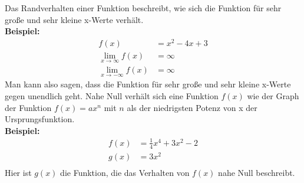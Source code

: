 \documentclass[25pt, a3paper, portrait]{tikzposter}
\begin{document}
    \begin{columns}
        {
            Das Randverhalten einer Funktion beschreibt, wie sich die Funktion für sehr große und sehr kleine x-Werte verhält. \\
            \textbf{Beispiel:}
            \begin{align*}
                f(x) &= x^2 - 4x + 3\\
                \lim_{x \to \infty} f(x) &= \infty\\
                \lim_{x \to -\infty} f(x) &= \infty
            \end{align*}
            Man kann also sagen, dass die Funktion für sehr große und sehr kleine x-Werte gegen unendlich geht.
        }
        {
            Nahe Null verhält sich eine Funktion $f(x)$ wie der Graph der Funktion $f(x) = ax^n$ mit $n$ als der niedrigsten Potenz von x der Ursprungsfunktion. \\
        \textbf{Beispiel:}
        \begin{align*}
            f(x) &= \frac{1}{4}x^4 + 3x^2 - 2\\
            g(x) &= 3x^2\\
        \end{align*}
        Hier ist $g(x)$ die Funktion, die das Verhalten von $f(x)$ nahe Null beschreibt.
        }
    \end{columns}
\end{document}
